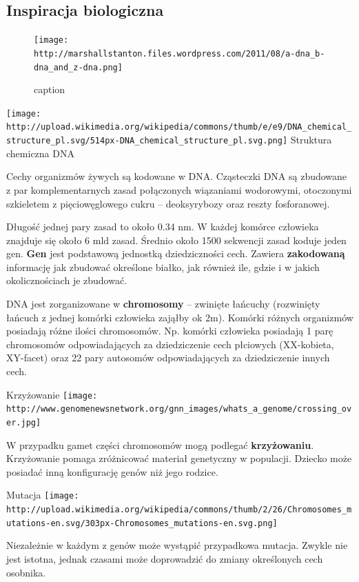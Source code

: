 \documentclass{article}
\begin{document}
    \subsection{Inspiracja biologiczna}

\begin{figure}[htbp]
\centering
\texttt{[image: http://marshallstanton.files.wordpress.com/2011/08/a-dna\_b-dna\_and\_z-dna.png]}
\caption{caption}
\end{figure}

    \texttt{[image: http://upload.wikimedia.org/wikipedia/commons/thumb/e/e9/DNA\_chemical\_structure\_pl.svg/514px-DNA\_chemical\_structure\_pl.svg.png]}
Struktura chemiczna DNA

    Cechy organizmów żywych są kodowane w DNA. Cząsteczki DNA są zbudowane z
par komplementarnych zasad połączonych wiązaniami wodorowymi, otoczonymi
szkieletem z pięciowęglowego cukru -- deoksyrybozy oraz reszty
fosforanowej.

Długość jednej pary zasad to około 0.34 nm. W każdej komórce człowieka
znajduje się około 6 mld zasad. Średnio około 1500 sekwencji zasad
koduje jeden gen. \textbf{Gen} jest podstawową jednostką dziedziczności
cech. Zawiera \textbf{zakodowaną} informację jak zbudować określone
białko, jak również ile, gdzie i w jakich okolicznościach je zbudować.

DNA jest zorganizowane w \textbf{chromosomy} -- zwinięte łańcuchy
(rozwinięty łańcuch z jednej komórki człowieka zająłby ok 2m). Komórki
różnych organizmów posiadają różne ilości chromosomów. Np. komórki
człowieka posiadają 1 parę chromosomów odpowiadających za dziedziczenie
cech płciowych (XX-kobieta, XY-facet) oraz 22 pary autosomów
odpowiadających za dziedziczenie innych cech.

    Krzyżowanie
\texttt{[image: http://www.genomenewsnetwork.org/gnn\_images/whats\_a\_genome/crossing\_over.jpg]}

    W przypadku gamet części chromosomów mogą podlegać \textbf{krzyżowaniu}.
Krzyżowanie pomaga zróżnicować materiał genetyczny w populacji. Dziecko
może posiadać inną konfigurację genów niż jego rodzice.

    Mutacja
\texttt{[image: http://upload.wikimedia.org/wikipedia/commons/thumb/2/26/Chromosomes\_mutations-en.svg/303px-Chromosomes\_mutations-en.svg.png]}

    Niezależnie w każdym z genów może wystąpić przypadkowa mutacja. Zwykle
nie jest istotna, jednak czasami może doprowadzić do zmiany określonych
cech osobnika.
\end{document}
